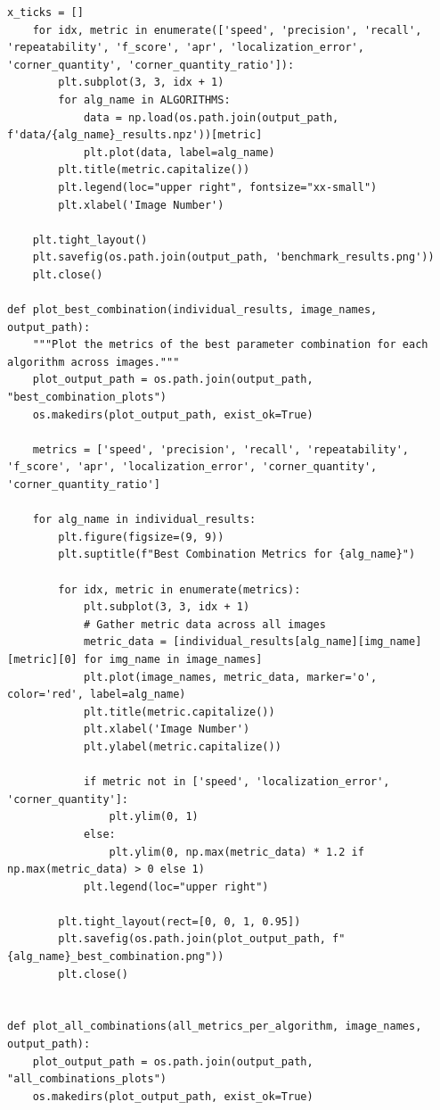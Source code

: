 \documentclass[journal]{IEEEtran}
\begin{document}
\begin{lstlisting}[style=python, caption={Utility Functions for Data Processing}, label={lst:utilities}]
    x_ticks = []
    for idx, metric in enumerate(['speed', 'precision', 'recall', 'repeatability', 'f_score', 'apr', 'localization_error', 'corner_quantity', 'corner_quantity_ratio']):
        plt.subplot(3, 3, idx + 1)
        for alg_name in ALGORITHMS:
            data = np.load(os.path.join(output_path, f'data/{alg_name}_results.npz'))[metric]
            plt.plot(data, label=alg_name)
        plt.title(metric.capitalize())
        plt.legend(loc="upper right", fontsize="xx-small")
        plt.xlabel('Image Number')
    
    plt.tight_layout()
    plt.savefig(os.path.join(output_path, 'benchmark_results.png'))
    plt.close()

def plot_best_combination(individual_results, image_names, output_path):
    """Plot the metrics of the best parameter combination for each algorithm across images."""
    plot_output_path = os.path.join(output_path, "best_combination_plots")
    os.makedirs(plot_output_path, exist_ok=True)
    
    metrics = ['speed', 'precision', 'recall', 'repeatability', 'f_score', 'apr', 'localization_error', 'corner_quantity', 'corner_quantity_ratio']
    
    for alg_name in individual_results:
        plt.figure(figsize=(9, 9))
        plt.suptitle(f"Best Combination Metrics for {alg_name}")
        
        for idx, metric in enumerate(metrics):
            plt.subplot(3, 3, idx + 1)
            # Gather metric data across all images
            metric_data = [individual_results[alg_name][img_name][metric][0] for img_name in image_names]
            plt.plot(image_names, metric_data, marker='o', color='red', label=alg_name)
            plt.title(metric.capitalize())
            plt.xlabel('Image Number')
            plt.ylabel(metric.capitalize())

            if metric not in ['speed', 'localization_error', 'corner_quantity']:
                plt.ylim(0, 1)
            else:
                plt.ylim(0, np.max(metric_data) * 1.2 if np.max(metric_data) > 0 else 1)
            plt.legend(loc="upper right")
        
        plt.tight_layout(rect=[0, 0, 1, 0.95])
        plt.savefig(os.path.join(plot_output_path, f"{alg_name}_best_combination.png"))
        plt.close()
        

def plot_all_combinations(all_metrics_per_algorithm, image_names, output_path):
    plot_output_path = os.path.join(output_path, "all_combinations_plots")
    os.makedirs(plot_output_path, exist_ok=True)
    

\end{lstlisting}
\end{document}
